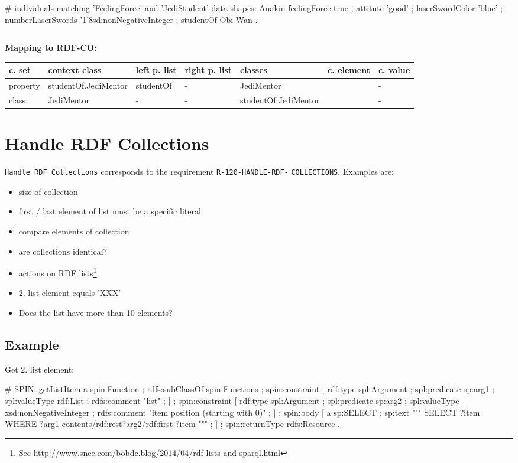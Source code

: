 \documentclass{llncs}
\newcommand{\ms}[1]{\texttt{#1}}
\newenvironment{gcotable}{
  \scriptsize
  \sffamily
  \vspace{0cm}
	\begin{center}
	\textbf{\vspace{0.4cm}Mapping to RDF-CO:} \\
  \begin{tabular}{l|l|l|l|l|l|l}
	\hline
  \textbf{c. set} & \textbf{context class} & \textbf{left p. list} & \textbf{right p. list} & \textbf{classes} & \textbf{c. element} & \textbf{c. value} \\
  \hline

}{
  \hline
  \end{tabular}
	\end{center}
}
\newenvironment{DL}{
\vspace{0cm}
	\begin{center}
  \begin{tabular}{r l}

}{
  \end{tabular}
	\end{center}
}
\begin{document}
\begin{ex}
# individuals matching 'FeelingForce' and 'JediStudent' data shapes:
Anakin 
    feelingForce true ;
    attitute 'good' ;
    laserSwordColor 'blue' ;
    numberLaserSwords '1'^^xsd:nonNegativeInteger ;
    studentOf Obi-Wan .
\end{ex}

\begin{DL}

\end{DL}

\begin{gcotable}
property &  studentOf.JediMentor & studentOf & - & JediMentor &  & - \\
class & JediMentor & - & - &  studentOf.JediMentor &  & - \\
\end{gcotable}

\section{Handle RDF Collections}

\ms{Handle RDF Collections} corresponds to the requirement
\ms{R-120-HANDLE-RDF-} \ms{COLLECTIONS}.
Examples are:
\begin{itemize}
	\item size of collection
	\item first / last element of list must be a specific literal
	\item compare elements of collection
	\item are collections identical?
	\item actions on RDF lists\footnote{See \url{http://www.snee.com/bobdc.blog/2014/04/rdf-lists-and-sparql.html}}
	\item 2. list element equals 'XXX'
	\item Does the list have more than 10 elements?
\end{itemize}

\subsection{Example}

Get 2. list element:

\begin{ex}
# SPIN:
getListItem
    a spin:Function ; rdfs:subClassOf spin:Functions ;
    spin:constraint [
        rdf:type spl:Argument ;
        spl:predicate sp:arg1 ;
        spl:valueType rdf:List ;
        rdfs:comment "list" ; ] ;
    spin:constraint [
        rdf:type spl:Argument ;
        spl:predicate sp:arg2 ;
        spl:valueType xsd:nonNegativeInteger ;
        rdfs:comment "item position (starting with 0)" ; ] ;
    spin:body [
        a sp:SELECT ;
        sp:text """
            SELECT ?item
            WHERE {
                ?arg1 contents/rdf:rest{?arg2}/rdf:first ?item } """ ; ] ;
    spin:returnType rdfs:Resource .
\end{ex}
\end{document}
